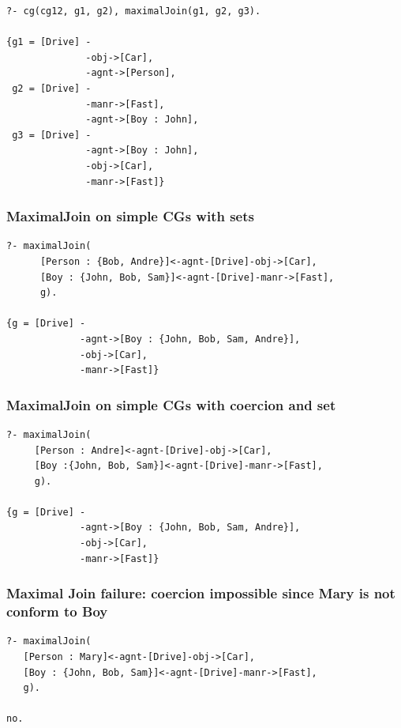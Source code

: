 \documentclass{book}
\begin{document}
\begin{verbatim}
?- cg(cg12, g1, g2), maximalJoin(g1, g2, g3).

{g1 = [Drive] -
              -obj->[Car],
              -agnt->[Person], 
 g2 = [Drive] -
              -manr->[Fast],
              -agnt->[Boy : John], 
 g3 = [Drive] -
              -agnt->[Boy : John],
              -obj->[Car],
              -manr->[Fast]}
\end{verbatim}


\subsubsection{MaximalJoin on simple CGs with sets}


\begin{verbatim}
?- maximalJoin(
      [Person : {Bob, Andre}]<-agnt-[Drive]-obj->[Car],
      [Boy : {John, Bob, Sam}]<-agnt-[Drive]-manr->[Fast],
      g).

{g = [Drive] -
             -agnt->[Boy : {John, Bob, Sam, Andre}],
             -obj->[Car],
             -manr->[Fast]}
\end{verbatim}



\subsubsection{MaximalJoin on simple CGs with coercion and set}


\begin{verbatim}
?- maximalJoin(
     [Person : Andre]<-agnt-[Drive]-obj->[Car],
     [Boy :{John, Bob, Sam}]<-agnt-[Drive]-manr->[Fast], 
     g).

{g = [Drive] -
             -agnt->[Boy : {John, Bob, Sam, Andre}],
             -obj->[Car],
             -manr->[Fast]}
\end{verbatim}




\subsubsection{Maximal Join failure: coercion impossible since Mary is not conform to Boy}


\begin{verbatim}
?- maximalJoin(
   [Person : Mary]<-agnt-[Drive]-obj->[Car],
   [Boy : {John, Bob, Sam}]<-agnt-[Drive]-manr->[Fast],
   g).

no.
\end{verbatim}
\end{document}
